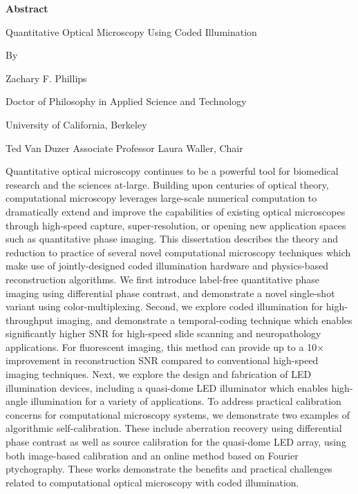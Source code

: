 \begin{center}
    \textbf{Abstract}

    \vspace{1.2cm}
     Quantitative Optical Microscopy Using Coded Illumination

    \vspace{0.4cm}

    By

    \vspace{0.4cm}
    Zachary F. Phillips

     \vspace{0.4cm}
     Doctor of Philosophy in Applied Science and Technology

     \vspace{0.4cm}
     University of California, Berkeley

     \vspace{0.4cm}
     Ted Van Duzer Associate Professor Laura Waller, Chair

    \vspace{0.8cm}


\end{center}

Quantitative optical microscopy continues to be a powerful tool for biomedical research and the sciences at-large. Building upon centuries of optical theory, computational microscopy leverages large-scale numerical computation to dramatically extend and improve the capabilities of existing optical microscopes through high-speed capture, super-resolution, or opening new application spaces such as quantitative phase imaging. This dissertation describes the theory and reduction to practice of several novel computational microscopy techniques which make use of jointly-designed coded illumination hardware and physics-based reconstruction algorithms. We first introduce label-free quantitative phase imaging using differential phase contrast, and demonstrate a novel single-shot variant using color-multiplexing. Second, we explore coded illumination for high-throughput imaging, and demonstrate a temporal-coding technique which enables significantly higher SNR for high-speed slide scanning and neuropathology applications. For fluorescent imaging, this method can provide up to a 10$\times$ improvement in reconstruction SNR compared to conventional high-speed imaging techniques. Next, we explore the design and fabrication of LED illumination devices, including a quasi-dome LED illuminator which enables high-angle illumination for a variety of applications. To address practical calibration concerns for computational microscopy systems, we demonstrate two examples of algorithmic self-calibration. These include aberration recovery using differential phase contrast as well as source calibration for the quasi-dome LED array, using both image-based calibration and an online method based on Fourier ptychography. These works demonstrate the benefits and practical challenges related to computational optical microscopy with coded illumination.

